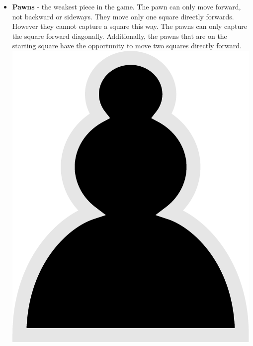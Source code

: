 \documentclass{article}
\begin{document}
\begin{itemize}
    \item \textbf{Pawns} - the weakest piece in the game. The pawn can only move forward, not backward or sideways. They move only one square directly forwards. However they cannot capture a square this way. The pawns can only capture the square forward diagonally. Additionally, the pawns that are on the starting square have the opportunity to move two squares directly forward.\\
    \includegraphics[scale=0.1]{image2.png}

\end{itemize}
\end{document}
